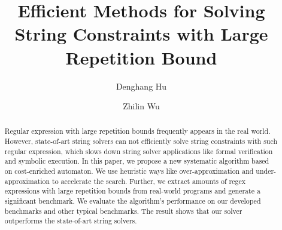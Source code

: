 \documentclass[runningheads]{llncs}
\begin{document}
\title{Efficient Methods for Solving String Constraints with Large Repetition Bound}

\author{Denghang Hu \and
Zhilin Wu}


\maketitle

\begin{abstract}
  Regular expression with large repetition bounds frequently appears in the real world. However, state-of-art string solvers can not efficiently solve string constraints with such regular expression, which slows down string solver applications like formal verification and symbolic execution. In this paper, we
  propose a new systematic algorithm based on cost-enriched automaton. We use
  heuristic ways like over-approximation and under-approximation to accelerate the search. Further, we extract amounts of regex expressions with large repetition
  bounds from real-world programs and generate a significant benchmark. We evaluate the algorithm's performance on our developed benchmarks and other typical benchmarks. The result shows that our solver outperforms the state-of-art string solvers.

\end{abstract}
\end{document}
